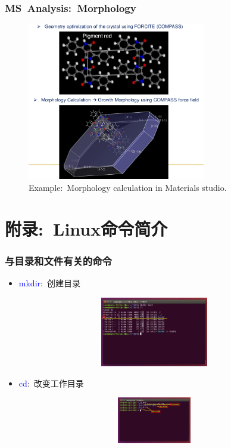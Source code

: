 \frame
{
	\frametitle{\textrm{MS~Analysis:~Morphology}}
\begin{figure}[h!]
\centering
\vspace*{-0.18in}
\includegraphics[height=2.70in,width=3.06in,viewport=0 0 817 722,clip]{Figures/MS-Crystallization-example.png}
\caption{\tiny \textrm{Example:~Morphology calculation in Materials studio.}}%
\label{MS-Morphology}
\end{figure}
}

\appendix
\section{附录:~\rm{Linux}命令简介}
\frame
{
	\frametitle{与目录和文件有关的命令}
	\begin{itemize}
\setlength{\itemsep}{-10pt}
		\item \textcolor{blue}{mkdir}:~创建目录
\begin{figure}[h!]
\centering
\vspace{-11.5pt}
\includegraphics[height=1.2in,width=3.9in,viewport=0 220 800 470,clip]{Figures/Ubuntu-mkdir.png}
\label{Linux-command-mkdir}
\end{figure}
		\item \textcolor{blue}{cd}:~改变工作目录
\begin{figure}[h!]
\centering
\vspace{-9.5pt}
\includegraphics[height=0.8in,width=3.9in,viewport=0 310 800 470,clip]{Figures/Ubuntu-cd.png}
\label{Linux-command-cd}
\end{figure}
	\end{itemize}
}

